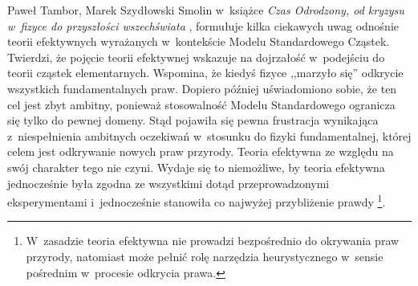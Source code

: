 \begin{artplenv}{Paweł Tambor, Marek Szydłowski}
Smolin w~książce \textit{Czas Odrodzony, od kryzysu w~fizyce do przyszłości wszechświata}
\parencite*[][]{smolin_czas_2015}, %
 formułuje kilka ciekawych uwag odnośnie teorii efektywnych wyrażanych w~kontekście Modelu Standardowego Cząstek. Twierdzi, że pojęcie teorii efektywnej wskazuje na dojrzałość w~podejściu do teorii cząstek elementarnych. Wspomina, że kiedyś fizyce ,,marzyło się'' odkrycie wszystkich fundamentalnych praw. Dopiero później uświadomiono sobie, że ten cel jest zbyt ambitny, ponieważ stosowalność Modelu Standardowego ogranicza się tylko do pewnej domeny. Stąd pojawiła się pewna frustracja wynikająca z~niespełnienia ambitnych oczekiwań w~stosunku do fizyki fundamentalnej, której celem jest odkrywanie nowych praw przyrody. Teoria efektywna ze względu na swój charakter tego nie czyni. Wydaje się to niemożliwe, by teoria efektywna jednocześnie była zgodna ze wszystkimi dotąd przeprowadzonymi eksperymentami i~jednocześnie stanowiła co najwyżej przybliżenie prawdy 
\parencite[][s.~165]{smolin_czas_2015}%
\footnote{W~zasadzie teoria efektywna nie prowadzi bezpośrednio do okrywania praw przyrody, natomiast może pełnić rolę narzędzia heurystycznego w~sensie pośrednim w~procesie odkrycia prawa.}.


\end{artplenv}
